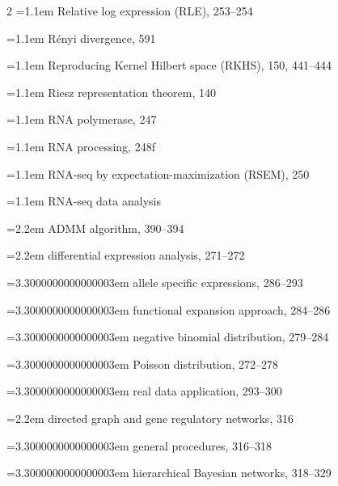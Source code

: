 \begin{multicols}{2}
\noindent\hangindent=1.1em Relative log expression (RLE), 253--254\par
\noindent\hangindent=1.1em Rényi divergence, 591\par
\noindent\hangindent=1.1em Reproducing Kernel Hilbert space (RKHS), 150, 441--444\par
\noindent\hangindent=1.1em Riesz representation theorem, 140\par
\noindent\hangindent=1.1em RNA polymerase, 247\par
\noindent\hangindent=1.1em RNA processing, 248f\par
\noindent\hangindent=1.1em RNA-seq by expectation-maximization (RSEM), 250\par
\noindent\hangindent=1.1em RNA-seq data analysis\par
\noindent\hangindent=2.2em \hspace*{1.1em}ADMM algorithm, 390--394\par
\noindent\hangindent=2.2em \hspace*{1.1em}differential expression analysis, 271--272\par
\noindent\hangindent=3.3000000000000003em \hspace*{2.2em}allele specific expressions, 286--293\par
\noindent\hangindent=3.3000000000000003em \hspace*{2.2em}functional expansion approach, 284--286\par
\noindent\hangindent=3.3000000000000003em \hspace*{2.2em}negative binomial distribution, 279--284\par
\noindent\hangindent=3.3000000000000003em \hspace*{2.2em}Poisson distribution, 272--278\par
\noindent\hangindent=3.3000000000000003em \hspace*{2.2em}real data application, 293--300\par
\noindent\hangindent=2.2em \hspace*{1.1em}directed graph and gene regulatory networks, 316\par
\noindent\hangindent=3.3000000000000003em \hspace*{2.2em}general procedures, 316--318\par
\noindent\hangindent=3.3000000000000003em \hspace*{2.2em}hierarchical Bayesian networks, 318--329\par

\end{multicols}
